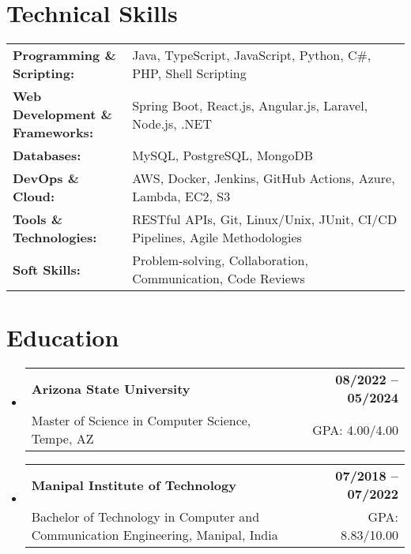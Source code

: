 \documentclass[letterpaper,11pt]{article}
\makeatletter
\newcommand{\educationSubheading}[4]{
  \vspace{-2pt}\item
    \begin{tabular*}{1.0\textwidth}[t]{l@{\extracolsep{\fill}}r}
      \textbf{\small #1} & \textbf{\small #2} \\
      {\small#3} & {\small #4} \\
    \end{tabular*}\vspace{-7pt}
}
\newcommand{\resumeSubHeadingListStart}{\begin{itemize}[leftmargin=0pt, label={}]}
\newcommand{\resumeSubHeadingListEnd}{\end{itemize}}
\makeatother
\begin{document}
\section{Technical Skills}
        \vspace{-14pt}
        \begin{table}[h]
            \footnotesize
            \begin{tabular}{p{0.3\linewidth} p{0.7\linewidth}}
                \textbf{Programming \& Scripting:} & Java, TypeScript, JavaScript, Python, C\#, PHP, Shell Scripting \\
                \textbf{Web Development \& Frameworks:} & Spring Boot, React.js, Angular.js, Laravel, Node.js, .NET \\
                \textbf{Databases:} & MySQL, PostgreSQL, MongoDB \\
                \textbf{DevOps \& Cloud:} & AWS, Docker, Jenkins, GitHub Actions, Azure, Lambda, EC2, S3 \\
                \textbf{Tools \& Technologies:} & RESTful APIs, Git, Linux/Unix, JUnit, CI/CD Pipelines, Agile Methodologies \\
                \textbf{Soft Skills:} & Problem-solving, Collaboration, Communication, Code Reviews \\
            \end{tabular}
        \end{table}

 \vspace{-15pt}

\section{Education}
  \resumeSubHeadingListStart
    \educationSubheading
      {Arizona State University}{08/2022 -- 05/2024}
      {Master of Science in Computer Science, Tempe, AZ}{GPA: 4.00/4.00}

    \educationSubheading
      {Manipal Institute of Technology}{07/2018 -- 07/2022}
      {Bachelor of Technology in Computer and Communication Engineering, Manipal, India}{GPA: 8.83/10.00}
  \resumeSubHeadingListEnd
\end{document}
